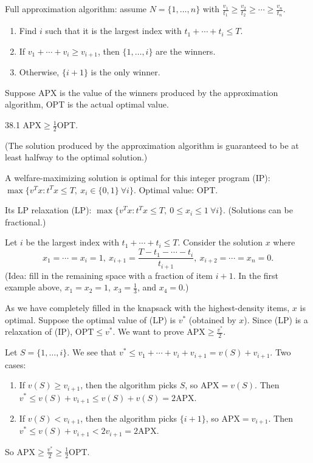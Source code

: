 \documentclass[12pt,letterpaper]{report}
\begin{document}
Full approximation algorithm: assume $N = \{1, \ldots, n\}$ with
$\frac{v_1}{t_1} \geq \frac{v_2}{t_2} \geq \cdots \geq \frac{v_n}{t_n}$.
\begin{enumerate}
  \item Find $i$ such that it is the largest index with $t_1 + \cdots + t_i \leq T$.
  \item If $v_1 + \cdots + v_i \geq v_{i + 1}$, then $\{1, \ldots, i\}$ are the winners.
  \item Otherwise, $\{i + 1\}$ is the only winner.
\end{enumerate}

Suppose APX is the value of the winners produced by the approximation algorithm, OPT is the actual
optimal value.

\begin{thm}{}{38.1}
  $\text{APX} \geq \frac{1}{2} \text{OPT}$.

  (The solution produced by the approximation algorithm is guaranteed to be at least halfway to the
  optimal solution.)
\end{thm}

\begin{thmproof}
  A welfare-maximizing solution is optimal for this integer program (IP):
  $\max \{ v^T x : t^T x \leq T, \ x_i \in \{0, 1\} \ \forall i \}$.
  Optimal value: OPT.

  Its LP relaxation (LP): $\max \{ v^T x : t^T x \leq T, \ 0 \leq x_i \leq 1 \ \forall i \}$.
  (Solutions can be fractional.)

  Let $i$ be the largest index with $t_1 + \cdots + t_i \leq T$.
  Consider the solution $x$ where
  \[
    x_1 = \cdots = x_i = 1, \ x_{i + 1} = \frac{T - t_1 - \cdots - t_i}{t_{i + 1}}, \
    x_{i + 2} = \cdots = x_n = 0.
  \]
  (Idea: fill in the remaining space with a fraction of item $i + 1$. In the first example above,
  $x_1 = x_2 = 1$, $x_3 = \frac{1}{3}$, and $x_4 = 0$.)

  As we have completely filled in the knapsack with the highest-density items, $x$ is optimal.
  Suppose the optimal value of (LP) is $v^*$ (obtained by $x$).
  Since (LP) is a relaxation of (IP), $\text{OPT} \leq v^*$.
  We want to prove $\text{APX} \geq \frac{v^*}{2}$.

  Let $S = \{1, \ldots, i\}$.
  We see that $v^* \leq v_1 + \cdots + v_i + v_{i + 1} = v(S) + v_{i + 1}$.
  Two cases:
  \begin{enumerate}
    \item
    If $v(S) \geq v_{i + 1}$, then the algorithm picks $S$, so $\text{APX} = v(S)$.
    Then $v^* \leq v(S) + v_{i + 1} \leq v(S) + v(S) = 2 \text{APX}$.
    \item
    If $v(S) < v_{i + 1}$, then the algorithm picks $\{i + 1\}$, so $\text{APX} = v_{i + 1}$.
    Then $v^* \leq v(S) + v_{i + 1} < 2 v_{i + 1} = 2 \text{APX}$.
  \end{enumerate}
  So $\text{APX} \geq \frac{v^*}{2} \geq \frac{1}{2} \text{OPT}$.
\end{thmproof}
\end{document}
